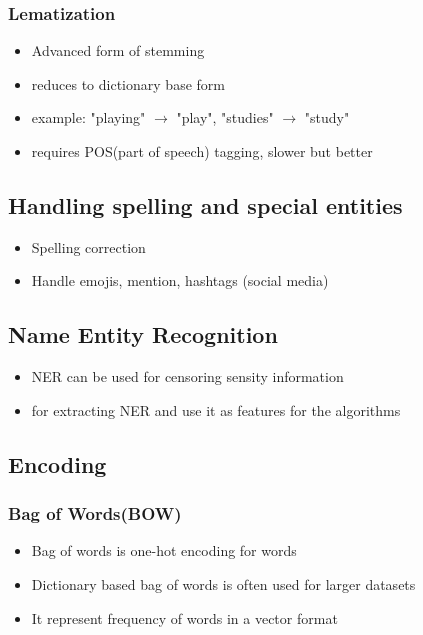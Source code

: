 \documentclass[12pt]{extarticle}
\begin{document}
\subsubsection{Lematization}
\begin{itemize}
    \item Advanced form of stemming
    \item reduces to dictionary base form
    \item example: "playing" $\to$ "play", "studies" $\to$ "study"
    \item requires POS(part of speech) tagging, slower but better
\end{itemize}

\subsection{Handling spelling and special entities}
\begin{itemize}
    \item Spelling correction
    \item Handle emojis, mention, hashtags (social media)
\end{itemize}
\subsection{Name Entity Recognition}
\begin{itemize}
    \item NER can be used for censoring sensity information
    \item for extracting NER and use it as features for the algorithms
\end{itemize}

\subsection{Encoding} \subsubsection{Bag of Words(BOW)}
\begin{itemize}
    \item Bag of words is one-hot encoding for words
    \item Dictionary based bag of words is often used for larger datasets
    \item It represent frequency of words in a vector format
\end{itemize}
\end{document}
